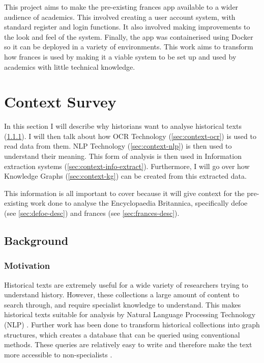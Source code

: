 \documentclass[12pt, letterpaper]{article}
\begin{document}
\begin{flushleft}
This project aims to make the pre-existing frances app available to a wider audience of academics. This involved creating a user account system, with standard register and login functions. It also involved making improvements to the look and feel of the system. Finally, the app was containerised using Docker so it can be deployed in a variety of environments. This work aims to transform how frances is used by making it a viable system to be set up and used by academics with little technical knowledge.
\end{flushleft}

\section{Context Survey}

\begin{flushleft}
In this section I will describe why historians want to analyse historical texts (\ref{sec:context-motivation}). I will then talk about how OCR Technology (\ref{sec:context-ocr}) is used to read data from them. NLP Technology (\ref{sec:context-nlp}) is then used to understand their meaning. This form of analysis is then used in Information extraction systems (\ref{sec:context-info-extract}). Furthermore, I will go over how Knowledge Graphs (\ref{sec:context-kg}) can be created from this extracted data.
\end{flushleft}

\begin{flushleft}
This information is all important to cover because it will give context for the pre-existing work done to analyse the Encyclopaedia Britannica, specifically defoe (see \ref{sec:defoe-desc}) and frances (see \ref{sec:frances-desc}).
\end{flushleft}

\subsection{Background}

\subsubsection{Motivation}\label{sec:context-motivation}

\begin{flushleft}
Historical texts are extremely useful for a wide variety of researchers trying to understand history. However, these collections a large amount of content to search through, and require specialist knowledge to understand. This makes historical texts suitable for analysis by Natural Language Processing Technology (NLP) \cite{nlp-historical}. Further work has been done to transform historical collections into graph structures, which creates a database that can be queried using conventional methods. These queries are relatively easy to write and therefore make the text more accessible to non-specialists \cite{rdf-historical}.
\end{flushleft}
\end{document}
